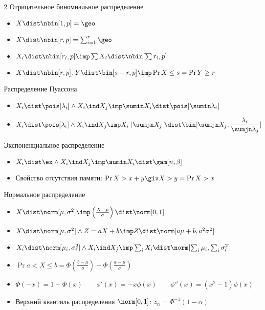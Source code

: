\documentclass[landscape]{article}
\begin{document}
\begin{multicols*}{2}
Отрицательное биномиальное распределение
\begin{itemize}
  \item $ X\dist \nbin[1,p] = \geo $
  \item $ X\dist \nbin[r,p] = \sum_{i=1}^r \geo $
  \item $X_i\dist \nbin[r_i,p] \imp \sum X_i\dist \nbin[\sum r_i,p] $
  \item $X\dist \nbin[r,p].\; Y\dist \bin[s+r,p] \imp \Pr{X\le s} = \Pr{Y\ge r}$
\end{itemize}

Распределение Пуассона
\begin{itemize}
  \item $X_i\dist\pois[\lambda_i] \wedge X_i \ind X_j
    \imp \displaystyle\sumin X_i \dist \pois[\displaystyle\sumin \lambda_i]$
  \item $X_i\dist\pois[\lambda_i] \wedge X_i \ind X_j
    \imp X_i\,\left|\displaystyle\sumjn X_j\right. \dist
   \bin[\displaystyle\sumjn X_j,\displaystyle\frac{\lambda_i}{\sumjn\lambda_j}]$
\end{itemize}

Экспоненциальное распределение
\begin{itemize}
  \item $X_i\dist\ex \wedge  X_i \ind X_j
    \imp \displaystyle\sumin X_i\dist \gam[n,\beta]$
  \item Свойство отсутствия памяти: $\Pr{X>x+y\giv X>y}=\Pr{X>x}$
\end{itemize}

Нормальное распределение
\begin{itemize}
  \item $X\dist \norm[\mu,\sigma^2]
    \imp \left(\frac{X-\mu}{\sigma}\right)\dist\norm[0,1] $
  \item $X\dist \norm[\mu,\sigma^2] \wedge Z = aX+b
    \imp Z\dist\norm[a\mu+b,a^2\sigma^2] $
  \item $X_i\dist\norm[\mu_i,\sigma_i^2] \wedge X_i \ind X_j
     \imp \sum_i X_i \dist \norm[\sum_i\mu_i,\sum_i\sigma_i^2]$
   \item $\Pr{a < X \le b}= \Phi\left(\frac{b-\mu}{\sigma}\right)
     - \Phi\left(\frac{a-\mu}{\sigma}\right) $
  \item $\Phi(-x) = 1 - \Phi(x) \qquad \phi'(x) = -x\phi(x) \qquad
    \phi''(x) = (x^2-1)\phi(x)$
  \item Верхний квантиль распределения $\norm[0,1]$: $z_{\alpha} = \Phi^{-1}(1-\alpha)$
\end{itemize}


\end{multicols*}
\end{document}
